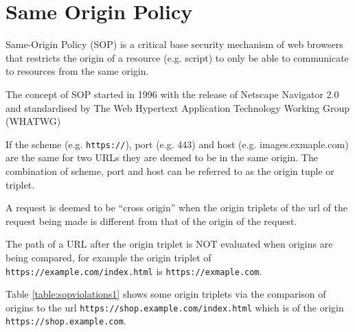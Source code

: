 \documentclass{mscreport}
\begin{document}
\section{Same Origin Policy}
\label{section:same_origin_policy}
\vspace{0.3cm} \noindent
Same-Origin Policy (SOP) is a critical base security mechanism of web browsers that restricts the origin of a resource (e.g. script) to only be able to communicate to resources from the same origin.

\vspace{0.3cm} \noindent
The concept of SOP started in 1996 with the release of Netscape Navigator 2.0 \cite{Preston2012-cs} and standardised by The Web Hypertext Application Technology Working Group (WHATWG) \cite{Multiple1996-ju}

\vspace{0.3cm} \noindent
If the scheme (e.g. \texttt{https://}), port (e.g. 443) and host (e.g. images.exmaple.com) are the same for two URLs they are deemed to be in the same origin. The combination of scheme, port and host can be referred to as the origin tuple or triplet.

\vspace{0.3cm} \noindent
A request is deemed to be ``cross origin'' when the origin triplets of the url of the request being made is different from that of the origin of the request.

\vspace{0.3cm} \noindent
The path of a URL after the origin triplet is NOT evaluated when origins are being compared, for example the origin triplet of \texttt{https://example.com/index.html} is \newline \texttt{https://exmaple.com}.

\vspace{0.3cm} \noindent
Table \ref{table:sopviolations1} shows some origin triplets via the comparison of origins to the url \newline \texttt{https://shop.example.com/index.html} which is of the origin \newline \texttt{https://shop.example.com}.
\end{document}

